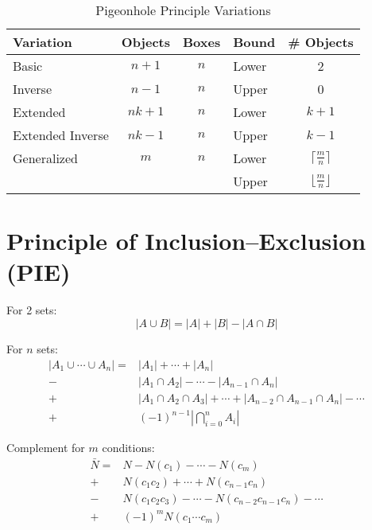 \documentclass{article}
\begin{document}
    \begin{table}[H]
        \centering
        \caption{Pigeonhole Principle Variations}
        \begin{tabular}{lcclc}
            \toprule
            Variation & Objects & Boxes & Bound & \# Objects \\
            \midrule
            Basic & $n + 1$ & $n$ & Lower & 2 \\
            Inverse & $n - 1$ & $n$ & Upper & 0 \\
            Extended & $nk + 1$ & $n$ & Lower & $k + 1$ \\
            Extended Inverse & $nk - 1$ & $n$ & Upper & $k - 1$ \\
            Generalized & $m$ & $n$ & Lower & $\lceil\frac{m}{n}\rceil$ \\
            & & & Upper & $\lfloor\frac{m}{n}\rfloor$ \\
            \bottomrule
        \end{tabular}
    \end{table}

    \section{Principle of Inclusion–Exclusion (PIE)}

    For 2 sets: \begin{equation}
        |A \cup B| = |A| + |B| - |A \cap B|
    \end{equation}

    For $n$ sets: \begin{equation}
        \begin{split}
            |A_1 \cup \cdots \cup A_n| = & |A_1| + \cdots + |A_n| \\
            - & |A_1 \cap A_2| - \cdots - |A_{n - 1} \cap A_n| \\
            + & |A_1 \cap A_2 \cap A_3| + \cdots + |A_{n - 2} \cap A_{n - 1} \cap A_n| - \cdots \\
            + & (-1)^{n - 1}\left\lvert\bigcap_{i = 0}^n{A_i}\right\rvert 
        \end{split}
    \end{equation}

    Complement for $m$ conditions: \begin{equation}
        \begin{split}
            \bar{N} = & N - N(c_1) - \cdots - N(c_m) \\
            + & N(c_1c_2) + \cdots + N(c_{n - 1}c_n) \\
            - & N(c_1c_2c_3) - \cdots - N(c_{n - 2}c_{n - 1}c_n) - \cdots \\
            + & (-1)^mN(c_1 \cdots c_m)
        \end{split}
    \end{equation}
\end{document}
